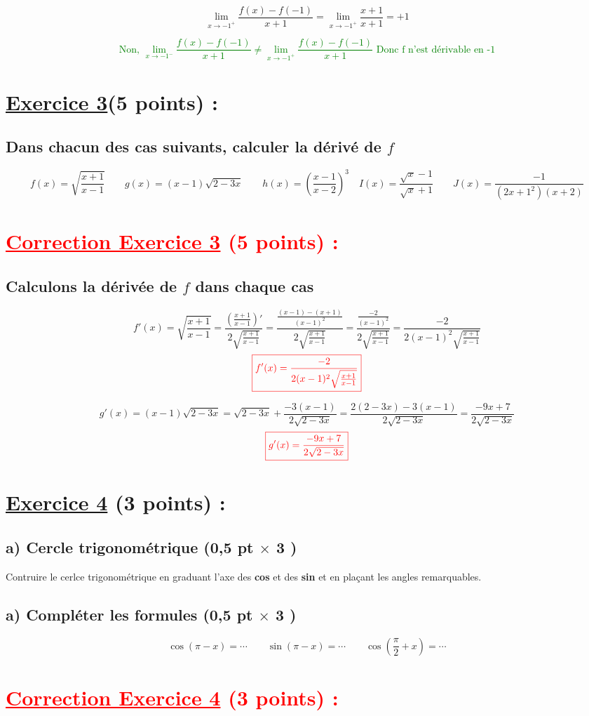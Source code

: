 \documentclass{article}
\begin{document}
\[\lim_{x \to -1^{+}}\frac{f(x)-f(-1)}{x+1}=\lim_{x \to -1^{+}}\frac{x+1}{x+1}=+1\]

\textcolor{green}{\[\text{Non, }\lim_{x \to -1^{-}}\frac{f(x)-f(-1)}{x+1}\neq\lim_{x \to -1^{+}}\frac{f(x)-f(-1)}{x+1}\text{ Donc f n'est dérivable en -1}\]}
\section*{\underline{Exercice 3}(5 points) :}
\subsection*{ Dans chacun des cas suivants, calculer la dérivé de $f$}
\[
f(x)=\sqrt{\frac{x+1}{x-1}}\quad\quad g(x)=(x-1)\sqrt{2-3x}\quad\quad h(x)=(\frac{x-1}{x-2})^{3}\quad I(x)=\frac{\sqrt{x}-1}{\sqrt{x}+1}\quad\quad J(x)=\frac{-1}{(2x+1^{2})(x+2)}
\]
\section*{\textcolor{red}{\underline{Correction Exercice 3} (5 points) :}}
\subsection*{ Calculons la dérivée de $f$ dans chaque cas}
\[
f'(x)=\sqrt{\frac{x+1}{x-1}}=\frac{(\frac{x+1}{x-1})'}{2\sqrt{\frac{x+1}{x-1}}}=\frac{\frac{(x-1)-(x+1)}{(x-1)^{2}}}{2\sqrt{\frac{x+1}{x-1}}}=\frac{\frac{-2}{(x-1)^{2}}}{2\sqrt{\frac{x+1}{x-1}}}=\frac{-2}{2(x-1)^{2}\sqrt{\frac{x+1}{x-1}}}
\]
\[\textcolor{red}{\boxed{f'(x)=\frac{-2}{2(x-1)^{2}\sqrt{\frac{x+1}{x-1}}}}}\]

\[g'(x)=(x-1)\sqrt{2-3x}=\sqrt{2-3x}+\frac{-3(x-1)}{2\sqrt{2-3x}}=\frac{2(2-3x)-3(x-1)}{2\sqrt{2-3x}}=\frac{-9x+7}{2\sqrt{2-3x}}\]
\[\textcolor{red}{\boxed{g'(x)=\frac{-9x+7}{2\sqrt{2-3x}}}}\]
\section*{\underline{Exercice 4} (3 points) :}
\subsection*{a) Cercle trigonométrique (0,5 pt $\times$ 3 )}
Contruire le cerlce trigonométrique en graduant l'axe des \textbf{cos} et des 
\textbf{sin} et en plaçant les angles remarquables.
\subsection*{a) Compléter les formules (0,5 pt $\times$ 3 )}
\[\cos(\pi-x)=\cdots\quad\quad \sin(\pi-x)=\cdots\quad\quad \cos(\frac{\pi}{2}+x)=\cdots\]
\section*{\textcolor{red}{\underline{Correction Exercice 4} (3 points) :}}
\end{document}
